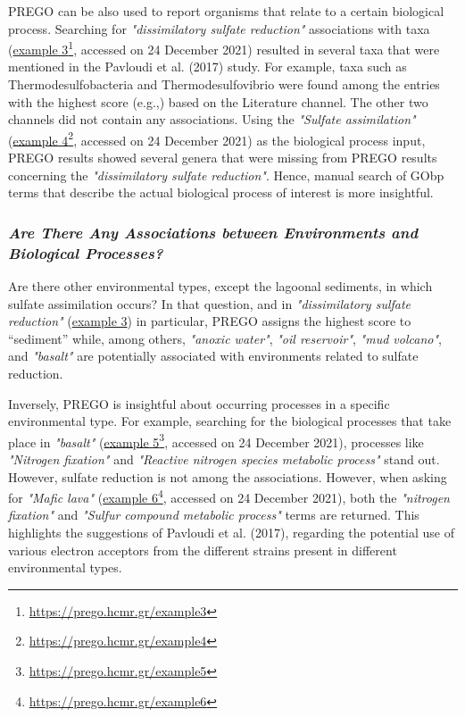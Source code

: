 {   PREGO can be also used to report organisms that relate to a certain biological process. Searching for \textit{"dissimilatory sulfate reduction"} associations with taxa (\href{https://prego.hcmr.gr/example3}{example 3}\footnote{\href{https://prego.hcmr.gr/example3}{https://prego.hcmr.gr/example3}}, accessed on 24 December 2021) resulted in several taxa that were mentioned in the Pavloudi et al. (2017) study. 
   For example, taxa such as Thermodesulfobacteria and Thermodesulfovibrio were found among the entries with the highest score (e.g.,) based on the Literature channel. 
   The other two channels did not contain any associations. 
   Using the \textit{"Sulfate assimilation"} (\href{https://prego.hcmr.gr/example4}{example 4}\footnote{\href{https://prego.hcmr.gr/example4}{https://prego.hcmr.gr/example4}}, accessed on 24 December 2021) as the biological process input, PREGO results showed several genera that were missing from PREGO results concerning the \textit{"dissimilatory sulfate reduction"}. 
   Hence, manual search of GObp terms that describe the actual biological process of interest is more insightful.


   \subsubsection*{\textit{Are There Any Associations between Environments and Biological Processes?}}
   \label{subsec:envo-proc}

   Are there other environmental types, except the lagoonal sediments, in which sulfate assimilation occurs? In that question, and in \textit{"dissimilatory sulfate reduction"} (\href{https://prego.hcmr.gr/example3}{example 3}) in particular, PREGO assigns the highest score to “sediment” while, among others, \textit{"anoxic water"}, \textit{"oil reservoir"}, \textit{"mud volcano"}, and \textit{"basalt"} are potentially associated with environments related to sulfate reduction.
   
   Inversely, PREGO is insightful about occurring processes in a specific environmental type. 
   For example, searching for the biological processes that take place in \textit{"basalt"} (\href{https://prego.hcmr.gr/example5}{example 5}\footnote{\href{https://prego.hcmr.gr/example5}{https://prego.hcmr.gr/example5}}, accessed on 24 December 2021), processes like \textit{"Nitrogen fixation"} and \textit{"Reactive nitrogen species metabolic process"} stand out. 
   However, sulfate reduction is not among the associations. 
   However, when asking for \textit{"Mafic lava"} (\href{https://prego.hcmr.gr/example6}{example 6}\footnote{\href{https://prego.hcmr.gr/example6}{https://prego.hcmr.gr/example6}}, accessed on 24 December 2021), both the \textit{"nitrogen fixation"} and \textit{"Sulfur compound metabolic process"} terms are returned. 
   This highlights the suggestions of Pavloudi et al. (2017), regarding the potential use of various electron acceptors from the different strains present in different environmental types.




}
